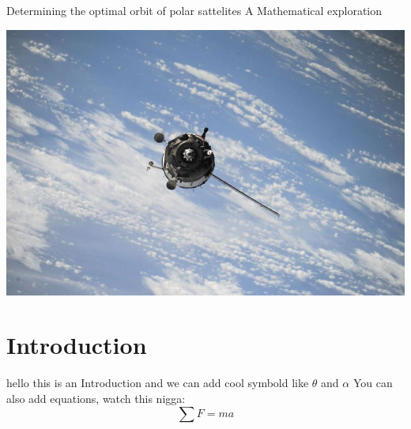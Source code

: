 \documentclass[12pt]{article}
\begin{document}
    \begin{titlepage}
        \begin{center}
            {\LARGE Determining the optimal orbit of polar sattelites}
            \break
            {\large A Mathematical exploration}
            \break
            {\date{06.11.2018}}
            


            \includegraphics[scale=0.32]{pic1.jpg}
            \vspace{10pt}
            \vfill
        \end{center}
    \end{titlepage}

    \section{Introduction}
    hello this is an Introduction and we can add cool symbold like $\theta$ and $\alpha$
    \break 
    You can also add equations, watch this nigga:
    \begin{equation}
        \sum F = ma      
    \end{equation}
    
\end{document}
